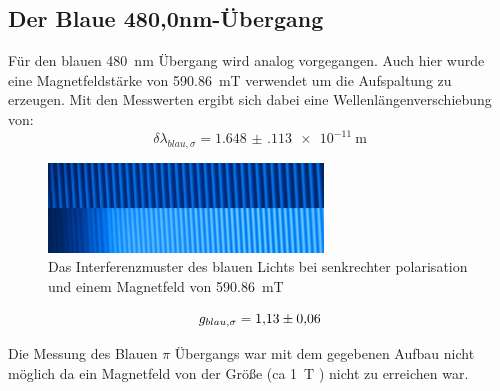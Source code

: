 \subsection{Der Blaue 480,0nm-Übergang}
Für den blauen \SI{480}{\nano\metre} Übergang wird analog vorgegangen. 
Auch hier wurde eine Magnetfeldstärke von \SI{590,86}{\milli\tesla} verwendet um die Aufspaltung zu erzeugen.
Mit den Messwerten ergibt sich dabei eine Wellenlängenverschiebung von:
\begin{equation*}
    \delta \lambda_{blau,\sigma} = \SI{1.648(113) e-11}{\metre}
\end{equation*}

\begin{figure}
    \center
    \includegraphics[width=0.65\textwidth]{bilder/bearbeitet/blau_senk.jpg}
    \caption{Das Interferenzmuster des blauen Lichts bei senkrechter polarisation und einem Magnetfeld von \SI{590,86}{\milli\tesla}}
    \label{fig:blau_senk}
\end{figure}

\begin{equation*}
    g_{blau,\sigma} = \num{1.13+-0.06}
\end{equation*}

Die Messung des Blauen $\pi$ Übergangs war mit dem gegebenen Aufbau nicht möglich da ein Magnetfeld von der Größe (ca \SI{1}{\tesla} ) nicht zu erreichen war.